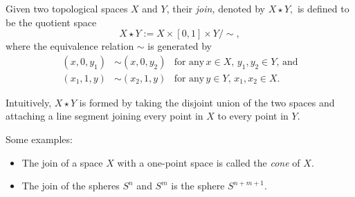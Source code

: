 \documentclass[12pt]{article}
\newcommand{\cross}{\times}
\begin{document}
Given two topological spaces $X$ and $Y$, their {\em join,} denoted by $X\star Y,$ is defined to be the quotient space
\[
X\star Y := X\cross[0,1]\cross Y/\sim,
\]
where the equivalence relation $\sim$ is generated by
\begin{eqnarray*}
(x,0,y_1)& \sim (x,0,y_2) &\text{for any}\, x\in X,\, y_1,y_2\in Y,\, \text{and}\\
(x_1,1,y)& \sim (x_2,1,y) &\text{for any}\, y\in Y,\, x_1,x_2\in X.
\end{eqnarray*}

Intuitively, $X\star Y$ is formed by taking the disjoint union of the two spaces and attaching a line segment joining every point in $X$ to every point in $Y.$

Some examples:

\begin{itemize}
\item The join of a space $X$ with a one-point space is called the \emph{cone} of $X$.
\item The join of the spheres $S^n$ and $S^m$ is the sphere $S^{n+m+1}$.
\end{itemize}
\end{document}
